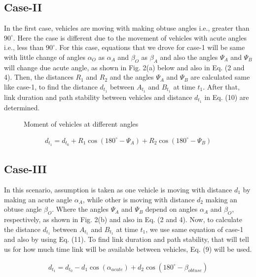 \documentclass[journal]{IEEEtran}
\begin{document}
\subsection{Case-II}
In the first case, vehicles are moving with making obtuse angles i.e., greater than $90^\circ$. Here the case is different due to the movement of vehicles with acute angles i.e., less than $90^\circ$. For this case, equations that we drove for case-1 will be same with little change of angles $\alpha_{O}$ as $\alpha_{A}$ and $\beta_{O}$ as $\beta_{A}$ and also the angles $\Psi_A$ and $\Psi_B$ will change due acute angle, as shown in Fig. 2(a) below and also in Eq. (2 and 4). Then, the distances $R_1$ and $R_2$ and the angles $\Psi_A$ and $\Psi_B$ are calculated same like case-1, to find the distance $d_{t_1}$ between $A_{t_1}$ and $B_{t_1}$ at time $t_1$. After that, link duration and path stability between vehicles and distance $d_{t_1}$ in Eq. (10) are determined.
\begin{figure}[h]
  \centering
 \caption{Moment of vehicles at different angles}
\end{figure}
\begin{eqnarray}
d_{t_1} =  d_{t_0}+R_{1}\cos{(180^{\circ}-\Psi_A)}+R_{2}\cos{(180^{\circ}-\Psi_B)}
\end{eqnarray}

\subsection{Case-III}
In this scenario, assumption is taken as one vehicle is moving with distance $d_1$ by making an acute angle $\alpha_{A}$, while other is moving with distance $d_2$ making an obtuse angle $\beta_{O}$. Where the angles $\Psi_A$ and $\Psi_B$ depend on angles $\alpha_{A}$ and $\beta_{O}$, respectively, as shown in Fig. 2(b) and also in Eq. (2 and 4). Now, to calculate the distance $d_{t_1}$ between $A_{t_1}$ and $B_{t_1}$ at time $t_1$, we use same equation of case-1 and also by using Eq. (11). To find link duration and path stability, that will tell us for how much time link will be available between vehicles, Eq. (9) will be used.

\begin{eqnarray}
d_{t_1} =  d_{t_0}-d_{1}\cos{(\alpha_{acute})}+d_{2}\cos{(180^{\circ}-\beta_{obtuse})}
\end{eqnarray}
\end{document}
